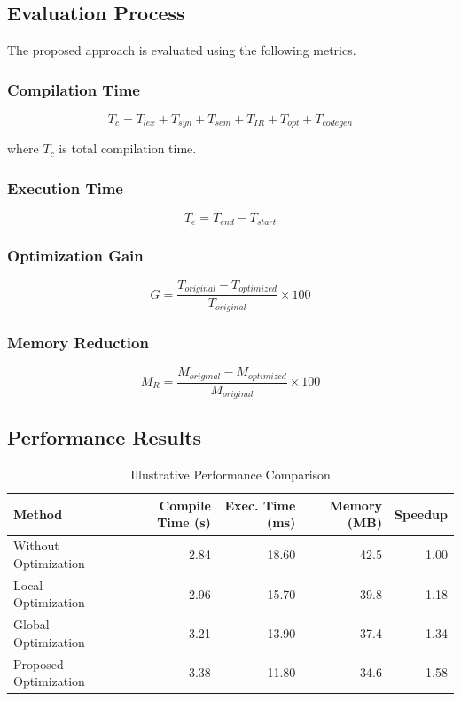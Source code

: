 \documentclass[12pt,a4paper]{article}
\begin{document}
\subsection{Evaluation Process}

The proposed approach is evaluated using the following metrics.

\subsubsection{Compilation Time}

\[
T_c=T_{lex}+T_{syn}+T_{sem}+T_{IR}+T_{opt}+T_{codegen}
\]

where $T_c$ is total compilation time.

\subsubsection{Execution Time}

\[
T_e=T_{end}-T_{start}
\]

\subsubsection{Optimization Gain}

\[
G=\frac{T_{original}-T_{optimized}}
{T_{original}}\times100
\]

\subsubsection{Memory Reduction}

\[
M_R=\frac{M_{original}-M_{optimized}}
{M_{original}}\times100
\]

\subsection{Performance Results}

\begin{table}[H]
\centering
\caption{Illustrative Performance Comparison}
\label{tab:performance}
\begin{tabular}{lrrrr}
\toprule
\textbf{Method} &
\textbf{Compile Time (s)} &
\textbf{Exec. Time (ms)} &
\textbf{Memory (MB)} &
\textbf{Speedup}\\
\midrule
Without Optimization & 2.84 & 18.60 & 42.5 & 1.00\\
Local Optimization & 2.96 & 15.70 & 39.8 & 1.18\\
Global Optimization & 3.21 & 13.90 & 37.4 & 1.34\\
Proposed Optimization & 3.38 & 11.80 & 34.6 & 1.58\\
\bottomrule
\end{tabular}
\end{table}
\end{document}
